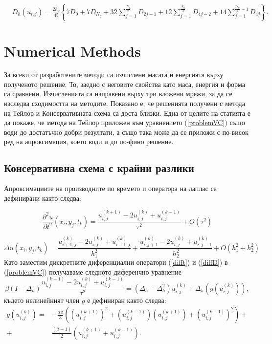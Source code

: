 \documentclass{article}
\newcommand{\be}{\begin{equation}}
\newcommand{\ee}{\end{equation}}
\newcommand{\rf}[1]{(\ref{#1})}
\begin{document}
\begin{align}\label{quadr6-2D}
&D_h(u_{i,j})  =
\frac{2h_2}{45} 
\left\{
7D_{0}+7D_{N_y}+32 \sum_{j=1}^{\frac{N_y}{2}}D_{2j-1}
+12\sum_{j=1}^{\frac{N_y}{4}}D_{4j-2}
+14 \sum_{j=1}^{\frac{N_y}{4}-1}D_{4j}
\right\}.
\end{align}

\section{Numerical Methods}

За всеки от разработените методи са изчислени масата и енергията върху полученото решение. То, заедно с неговите свойства като маса, енергия и форма са сравнени. Изчисленията са направени върху три вложени мрежи, за да се изследва сходимостта на методите. Показано е, че решенията получени с метода на Тейлор и Консервативната схема са доста близки. Една от целите на статията е да покаже, че метода на Тейлор приложен към уравнението \rf{problemVC} също води до достатъчно добри резултати, а също така може да се приложи с по-висок ред на апроксимация, което води и до по-фино решение.

\subsection{ Консервативна схема с крайни разлики }


Апроксимациите на производните по времето и оператора на лаплас са дефинирани както следва:

\be\label{difft}
\frac{\partial^2 u}{\partial t^2}(x_i, y_j, t_k ) = \frac{ u^{(k+1)}_{i, j} - 2u^{(k)}_{i,j} + u^{(k-1)}_{i,j} }{\tau^2} + O(\tau^2) 
\ee

\be\label{diffD}
\Delta u(x_i, y_j, t_k )  = \frac{ u^{(k)}_{i+1, j} - 2u^{(k)}_{i,j} + u^{(k)}_{i-1,j} }{h_1^2} + \frac{ u^{(k)}_{i, j+1} - 2u^{(k)}_{i,j} + u^{(k)}_{i,j-1} }{h_2^2} + O(h_1^2 + h_2^2) 
\ee
Като заместим дискретните диференциални оператори \rf{difft} и \rf{diffD} в \rf{problemVC} получаваме следното диференчно уравнение
\be\label{consFDS}
\beta (I-\Delta_h)\frac{ u^{(k+1)}_{i, j} - 2u^{(k)}_{i,j} + u^{(k-1)}_{i,j} }{\tau^2} = (\Delta_h - \Delta_h^2)u^{(k)}_{i,j} + \Delta_h(g(u^{(k)}_{i,j})),
\ee
%
където нелинейният член $g$ е дефиниран както следва:
\begin{align}
g(u^{(k)}_{i,j})=& -\frac{\alpha \beta} { 3 } \left( (u^{(k+1)}_{i,j})^2 + (u^{(k-1)}_{i,j})(u^{(k+1)}_{i,j}) + (u^{(k-1)}_{i,j})^2 \right) + \nonumber\\
+&\frac{ (\beta - 1 )}{ 2 }\left( u^{(k+1)}_{i,j} + u^{(k-1)}_{i,j} \right).
\end{align}
\end{document}
